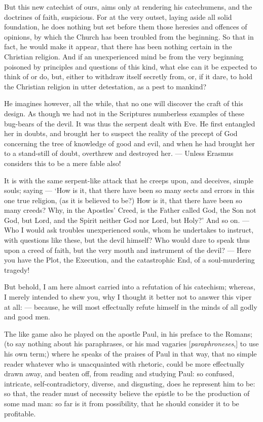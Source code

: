 But this new catechist of ours, aims only at rendering his catechumens, and the doctrines of faith, suspicious. For at the very outset, laying aside all solid foundation, he does nothing but set before them those heresies and offences of opinions, by which the Church has been troubled from the beginning. So that in fact, he would make it appear, that there has been nothing certain in the Christian religion. And if an unexperienced mind be from the very beginning poisoned by principles and questions of this kind, what else can it be expected to think of or do, but, either to withdraw itself secretly from, or, if it dare, to hold the Christian religion in utter detestation, as a pest to mankind?

He imagines however, all the while, that no one will discover the craft of this design. As though we had not in the Scriptures numberless examples of these bug-bears of the devil. It was thus the serpent dealt with Eve. He first entangled her in doubts, and brought her to suspect the reality of the precept of God concerning the tree of knowledge of good and evil, and when he had brought her to a stand-still of doubt, overthrew and destroyed her. — Unless Erasmus considers this to be a mere fable also!

It is with the same serpent-like attack that he creeps upon, and deceives, simple souls; saying — ‘How is it, that there have been so many sects and errors in this one true religion, (as it is believed to be?) How is it, that there have been so many creeds? Why, in the Apostles’ Creed, is the Father called God, the Son not God, but Lord, and the Spirit neither God nor Lord, but Holy?’ And so on. — Who I would ask troubles unexperienced souls, whom he undertakes to instruct, with questions like these, but the devil himself? Who would dare to speak thus upon a creed of faith, but the very mouth and instrument of the devil? — Here you have the Plot, the Execution, and the catastrophic End, of a soul-murdering tragedy!

But behold, I am here almost carried into a refutation of his catechism; whereas, I merely intended to shew you, why I thought it better not to answer this viper at all: — because, he will most effectually refute himself in the minds of all godly and good men.

The like game also he played on the apostle Paul, in his preface to the Romans; (to say nothing about his paraphrases, or his mad vagaries [\emph{paraphroneses},] to use his own term;) where he speaks of the praises of Paul in that way, that no simple reader whatever who is unacquainted with rhetoric, could be more effectually drawn away, and beaten off, from reading and studying Paul: so confused, intricate, self-contradictory, diverse, and disgusting, does he represent him to be: so that, the reader must of necessity believe the epistle to be the production of some mad man: so far is it from possibility, that he should consider it to be profitable.

